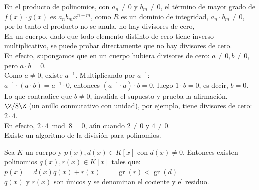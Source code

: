 En el producto de polinomios, con $a_n \neq 0$ y $b_m \neq 0$, el término de mayor grado de $f(x) \cdot g(x)$ es $a_n b_m x^{n+m}$, como $R$ es un dominio de integridad, $a_n \cdot b_m \neq 0$, por lo tanto el producto no se anula, no hay divisores de cero, \\

En un cuerpo, dado que todo elemento distinto de cero tiene inverso multiplicativo, se puede probar directamente que no hay divisores de cero. \\
En efecto, supongamos que en un cuerpo hubiera divisores de cero: $a \neq 0, b \neq 0$, pero $a \cdot b = 0$. \\
Como $a \neq 0$, existe $a^{-1}$. Multiplicando por $a^{-1}$: \\  
$a^{-1} \cdot (a \cdot b) = a^{-1} \cdot 0$, entonces $(a^{-1} \cdot a) \cdot b = 0$, luego $1 \cdot b = 0$, es decir, $b = 0$. \\
Lo que contradice que $b \neq 0$, invalida el supuesto y prueba la afirmación. \\

$\Z/8\Z$ (un anillo conmutativo con unidad), por ejemplo, tiene divisores de cero: $2 \cdot 4$. \\
En efecto, $2 \cdot 4 \bmod 8 = 0$, aún cuando $2 \neq 0$ y $4 \neq 0$. \\

Existe un algoritmo de la división para polinomios.

\begin{enunciado}\label{enun:algDivisionPol}
Sea $K$ un cuerpo y $p(x), d(x) \in K[x]$ con $d(x) \neq 0$. Entonces existen polinomios $q(x), r(x) \in K[x]$ tales que: \\
$p(x) = d(x)q(x) + r(x) \qquad$ $\operatorname{gr}(r) < \operatorname{gr}(d)$ \\
$q(x)$ y $r(x)$ son únicos y se denominan el cociente y el residuo.
\end{enunciado}


